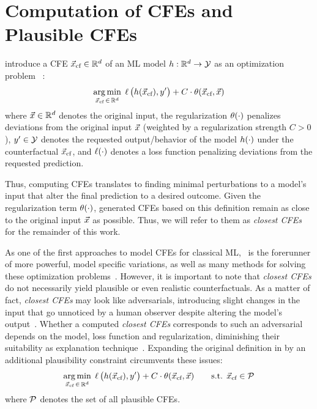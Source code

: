 \section{Computation of CFEs and Plausible CFEs}\label{sec:EffCompCFs}
\citeauthor{wachter_counterfactual_2017} introduce a \gls{CFE} ${\vec{x}_{\text{cf}}}\in\mathbb{R}^d$ of an \gls{ML} model $h:\mathbb{R}^d\to\mathcal{Y}$ as an optimization problem~\citep{wachter_counterfactual_2017} :
\begin{equation}\label{eq:counterfactual_opt_original}
\underset{{\vec{x}_{\text{cf}}} \,\in\, \mathbb{R}^d}{\arg\min}\; \operatorname*{{\ell}}\big(h({\vec{x}_{\text{cf}}}), y'\big) + C \cdot \operatorname*{{\theta}}({\vec{x}_{\text{cf}}}, \vec{x})
\end{equation}
where $\vec{x}\in\mathbb{R}^d$ denotes the original input, the regularization $\operatorname*{{\theta}}(\cdot)$ penalizes deviations from the original input $\vec{x}$ (weighted by a regularization strength $C>0$), $y'\in\mathcal{Y}$ denotes the requested output/behavior of the model $h(\cdot)$ under the counterfactual ${\vec{x}_{\text{cf}}}$, and $\operatorname*{{\ell}}(\cdot)$ denotes a loss function penalizing deviations from the requested prediction.

Thus, computing \glspl{CFE} translates to finding minimal perturbations to a model's input that alter the final prediction to a desired outcome. Given the regularization term $\operatorname*{{\theta}}(\cdot)$, generated \glspl{CFE} based on this definition remain as close to the original input $\vec{x}$ as possible. 
Thus, we will refer to them as \textit{closest \glspl{CFE}} for the remainder of this work.

As one of the first approaches to model \glspl{CFE} for classical \gls{ML},~ is the forerunner of more powerful, model specific variations, as well as many methods for solving these optimization problems~\citep{verma_counterfactual_2020,artelt_computation_2019,karimi_survey_2020}.
However, it is important to note that \textit{closest \glspl{CFE}} do not necessarily yield plausible or even realistic counterfactuals.
As a matter of fact, \textit{closest \glspl{CFE}} may look like adversarials, introducing slight changes in the input that go unnoticed by a human observer despite altering the model's output~\citep{papernot_practical_2017}. 
Whether a computed \textit{closest \glspl{CFE}} corresponds to such an adversarial depends on the model, loss function and regularization, diminishing their suitability as explanation technique~\citep{laugel_issues_2019}.
Expanding the original definition in  by an additional plausibility constraint circumvents these issues:
\begin{equation}
\begin{split}
\underset{{\vec{x}_{\text{cf}}} \,\in\, \mathbb{R}^d}{\arg\min}\; \operatorname*{{\ell}}\big(h({\vec{x}_{\text{cf}}}), y'\big) + C \cdot \operatorname*{{\theta}}({\vec{x}_{\text{cf}}}, \vec{x}) \quad\quad \text{s.t. } {\vec{x}_{\text{cf}}} \in \mathcal{P}
\end{split}
\end{equation}
where $\mathcal{P}$ denotes the set of all plausible \glspl{CFE}.

